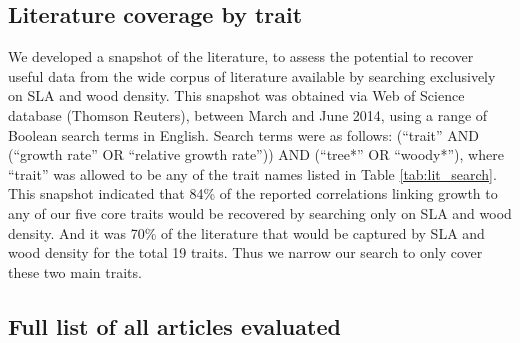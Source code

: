 \documentclass[10pt,twoside]{article}\usepackage[]{graphicx}\usepackage[]{color}
\begin{document}
\subsection{Literature coverage by trait}\label{app:literature-snapshot}

We developed a snapshot of the literature, to assess the potential to recover useful data from the wide corpus of literature available by searching exclusively on SLA and wood density. This snapshot was obtained via Web of Science database (Thomson Reuters), between March and June 2014, using a range of Boolean search terms in English. Search terms were as follows: (``trait'' AND (``growth rate'' OR ``relative growth rate'')) AND (``tree*'' OR ``woody*''), where ``trait'' was allowed to be any of the trait names listed in Table \ref{tab:lit_search}. This snapshot indicated that 84\% of the reported correlations linking growth to any of our five core traits would be recovered by searching only on SLA and wood density. And it was 70\% of the literature that would be captured by SLA and wood density for the total 19 traits. Thus we narrow our search to only cover these two main traits.


\subsection{Full list of all articles evaluated}\label{app:literature-list}
\end{document}
